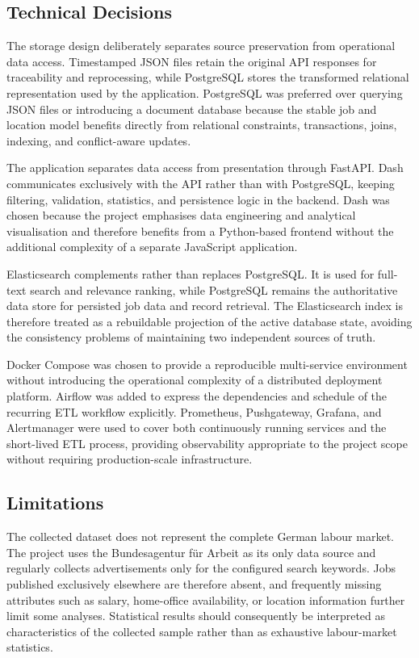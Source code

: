 \documentclass[11pt,a4paper]{article}
\begin{document}
\subsection{Technical Decisions}

The storage design deliberately separates source preservation from operational data access. Timestamped JSON files retain the original API responses for traceability and reprocessing, while PostgreSQL stores the transformed relational representation used by the application. PostgreSQL was preferred over querying JSON files or introducing a document database because the stable job and location model benefits directly from relational constraints, transactions, joins, indexing, and conflict-aware updates.

The application separates data access from presentation through FastAPI. Dash communicates exclusively with the API rather than with PostgreSQL, keeping filtering, validation, statistics, and persistence logic in the backend. Dash was chosen because the project emphasises data engineering and analytical visualisation and therefore benefits from a Python-based frontend without the additional complexity of a separate JavaScript application.

Elasticsearch complements rather than replaces PostgreSQL. It is used for full-text search and relevance ranking, while PostgreSQL remains the authoritative data store for persisted job data and record retrieval. The Elasticsearch index is therefore treated as a rebuildable projection of the active database state, avoiding the consistency problems of maintaining two independent sources of truth.

Docker Compose was chosen to provide a reproducible multi-service environment without introducing the operational complexity of a distributed deployment platform. Airflow was added to express the dependencies and schedule of the recurring ETL workflow explicitly. Prometheus, Pushgateway, Grafana, and Alertmanager were used to cover both continuously running services and the short-lived ETL process, providing observability appropriate to the project scope without requiring production-scale infrastructure.


\subsection{Limitations}

The collected dataset does not represent the complete German labour market. The project uses the Bundesagentur für Arbeit as its only data source and regularly collects advertisements only for the configured search keywords. Jobs published exclusively elsewhere are therefore absent, and frequently missing attributes such as salary, home-office availability, or location information further limit some analyses. Statistical results should consequently be interpreted as characteristics of the collected sample rather than as exhaustive labour-market statistics.
\end{document}
